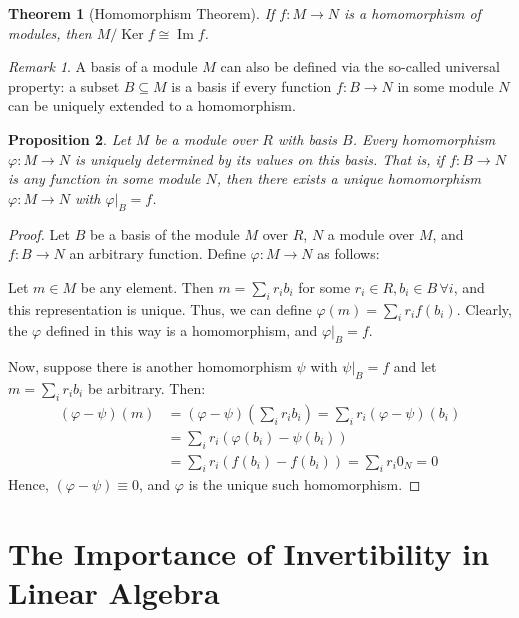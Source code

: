 \documentclass{article}
\newif\ifusemulticols
\theoremstyle{definition}
\theoremstyle{remark}
\newtheorem*{note}{Remark}
\theoremstyle{plain}
\newtheorem{theorem}{Theorem}
\theoremstyle{plain}
\newtheorem{prop}[theorem]{Proposition}
\newenvironment{mymulticols}
    { \ifusemulticols \begin{multicols}{2} \fi }
    { \ifusemulticols \end{multicols} \fi }
\DeclareMathOperator{\Ker}{Ker}
\DeclareMathOperator{\image}{Im}
\begin{document}
\begin{mymulticols}
\begin{theorem}[Homomorphism Theorem]
    If ${f : M\to N}$ is a homomorphism of modules, then $M / \Ker f \cong \image f$.
\end{theorem}

\begin{note}
    A basis of a module $M$ can also be defined via the so-called universal property: a subset $B \subseteq M$ is a basis if every function $f: B \to N$ in some module $N$ can be uniquely extended to a homomorphism.
\end{note}

\begin{prop}
    \label{prop:homomorphism_univer_prop}
    Let $M$ be a module over $R$ with basis $B$. Every homomorphism $\varphi : M \to N$ is uniquely determined by its values on this basis. That is, if $f : B \to N$ is any function in some module $N$, then there exists a unique homomorphism $\varphi : M \to N$ with $\varphi\big|_B = f$.
\end{prop}

\begin{proof}
    Let $B$ be a basis of the module $M$ over $R$, $N$ a module over $M$, and $f : B \to N$ an arbitrary function.
    Define $\varphi : M \to N$ as follows:

    Let $m \in M$ be any element. Then $m = \sum_i r_i b_i$ for some $r_i \in R, b_i \in B \, \forall i$, and this representation is unique. Thus, we can define $\varphi(m) = \sum_i r_i f(b_i)$.
    Clearly, the $\varphi$ defined in this way is a homomorphism, and $\varphi\big|_B=f$.

    Now, suppose there is another homomorphism $\psi$ with $\psi\big|_B=f$ and let $m = \sum_i r_i b_i$ be arbitrary.
    Then:
    \begin{align*}
        (\varphi-\psi)(m) &= (\varphi - \psi)\left(\sum_i r_i b_i\right)
                            = \sum_i r_i (\varphi - \psi)(b_i)\\
                          &= \sum_i r_i (\varphi(b_i) - \psi(b_i))\\
                          &= \sum_i r_i (f(b_i) - f(b_i)) = \sum_i r_i 0_N = 0
    \end{align*}
    Hence, $(\varphi-\psi) \equiv 0$, and $\varphi$ is the unique such homomorphism.
\end{proof}

\section{The Importance of Invertibility in Linear Algebra}


\end{mymulticols}
\end{document}
